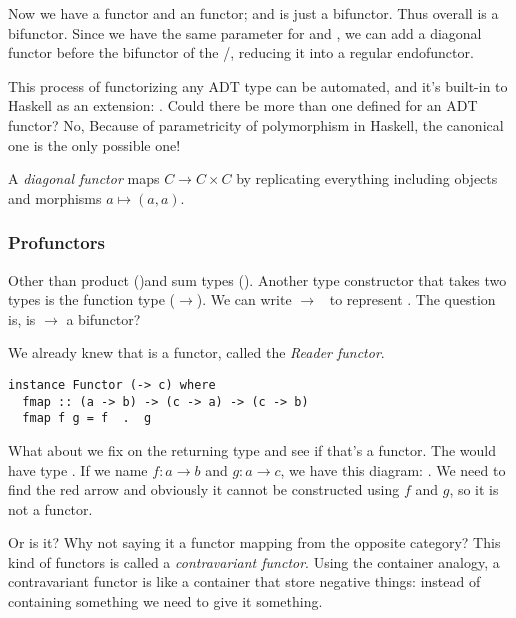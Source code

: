 Now we have a  functor and an  functor; and
 is just a bifunctor. Thus overall  is a bifunctor.
Since we have the same parameter  for  and
, we can add a diagonal functor before the bifunctor of the
/, reducing it into a regular endofunctor.

This process of functorizing any ADT type can be automated, and it's built-in to
Haskell as an extension: . Could there be more than one
 defined for an ADT functor? No, Because of parametricity of
polymorphism in Haskell, the canonical one is the only possible one!

\hfill
\begin{remark}
  A \emph{diagonal functor} maps $C \to C \times C$ by replicating everything
  including objects and morphisms $a \mapsto (a, a)$.
\end{remark}

\subsubsection{Profunctors}

Other than product (\code{()})and sum types (). Another type
constructor that takes two types is the function type ($\to$). We can write
\code{(}$\to$\code{)}~ to represent . The question is, is
$\to$ a bifunctor?

We already knew that  is a functor, called the \emph{Reader
  functor}.

\begin{lstlisting}
instance Functor (-> c) where
  fmap :: (a -> b) -> (c -> a) -> (c -> b)
  fmap f g = f  .  g
\end{lstlisting}

What about we fix on the returning type and see if that's a functor. The
 would have type .
If we name $f: a\to b$ and $g: a \to c$, we have this diagram: . We need to find the red arrow and
obviously it cannot be constructed using $f$ and $g$, so it is not a functor.

Or is it? Why not saying it a functor mapping from the opposite category? This
kind of functors is called a \emph{contravariant functor}. Using the container
analogy, a contravariant functor is like a container that store negative things:
instead of containing something we need to give it something.

